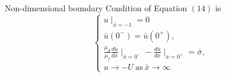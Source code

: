 \documentclass[11 pt]{article}
\begin{document}
Non-dimensional boundary Condition of Equation $(14)$ is
 \begin{equation}
  \left\{
   \begin{array}{ll}
   u\mid_{\bar x=-1}=0         &\\
  \bar u(0^{-})=\bar u(0^{+}),&\\
  \frac{\mu_{d}}{\mu_{f}}
  \frac{d\bar u}{d \bar x}\mid_{\bar x=0^{-}}-\frac{d\bar  u}{d\bar  x}\mid_{\bar x=0^{+}}=\bar \sigma ,  &\\
  u \rightarrow -U  ~ \text{as} ~ \bar x \rightarrow \infty
   \end{array}
  \right.
  \label{15}
\end{equation}


\end{document}
